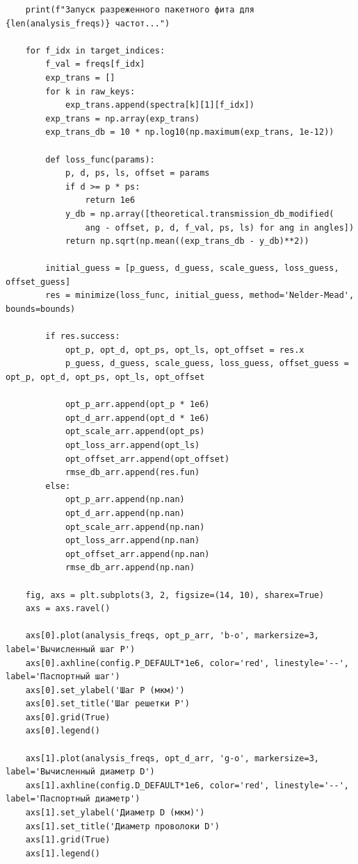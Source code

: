 \begin{verbatim}
    print(f"Запуск разреженного пакетного фита для {len(analysis_freqs)} частот...")
    
    for f_idx in target_indices:
        f_val = freqs[f_idx]
        exp_trans = []
        for k in raw_keys:
            exp_trans.append(spectra[k][1][f_idx])
        exp_trans = np.array(exp_trans)
        exp_trans_db = 10 * np.log10(np.maximum(exp_trans, 1e-12))
        
        def loss_func(params):
            p, d, ps, ls, offset = params
            if d >= p * ps:
                return 1e6
            y_db = np.array([theoretical.transmission_db_modified(
                ang - offset, p, d, f_val, ps, ls) for ang in angles])
            return np.sqrt(np.mean((exp_trans_db - y_db)**2))
            
        initial_guess = [p_guess, d_guess, scale_guess, loss_guess, offset_guess]
        res = minimize(loss_func, initial_guess, method='Nelder-Mead', bounds=bounds)
        
        if res.success:
            opt_p, opt_d, opt_ps, opt_ls, opt_offset = res.x
            p_guess, d_guess, scale_guess, loss_guess, offset_guess = opt_p, opt_d, opt_ps, opt_ls, opt_offset
            
            opt_p_arr.append(opt_p * 1e6)
            opt_d_arr.append(opt_d * 1e6)
            opt_scale_arr.append(opt_ps)
            opt_loss_arr.append(opt_ls)
            opt_offset_arr.append(opt_offset)
            rmse_db_arr.append(res.fun)
        else:
            opt_p_arr.append(np.nan)
            opt_d_arr.append(np.nan)
            opt_scale_arr.append(np.nan)
            opt_loss_arr.append(np.nan)
            opt_offset_arr.append(np.nan)
            rmse_db_arr.append(np.nan)
            
    fig, axs = plt.subplots(3, 2, figsize=(14, 10), sharex=True)
    axs = axs.ravel()
    
    axs[0].plot(analysis_freqs, opt_p_arr, 'b-o', markersize=3, label='Вычисленный шаг P')
    axs[0].axhline(config.P_DEFAULT*1e6, color='red', linestyle='--', label='Паспортный шаг')
    axs[0].set_ylabel('Шаг P (мкм)')
    axs[0].set_title('Шаг решетки P')
    axs[0].grid(True)
    axs[0].legend()
    
    axs[1].plot(analysis_freqs, opt_d_arr, 'g-o', markersize=3, label='Вычисленный диаметр D')
    axs[1].axhline(config.D_DEFAULT*1e6, color='red', linestyle='--', label='Паспортный диаметр')
    axs[1].set_ylabel('Диаметр D (мкм)')
    axs[1].set_title('Диаметр проволоки D')
    axs[1].grid(True)
    axs[1].legend()
    

\end{verbatim}
